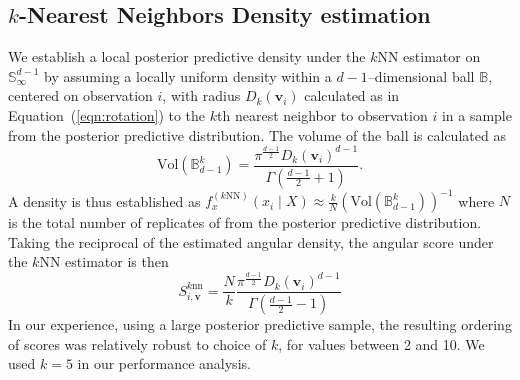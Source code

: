 \subsection{$k$-Nearest Neighbors Density estimation}
We establish a local posterior predictive density under the $k$NN estimator 
    \citep{mack1979} on $\mathbb{S}_{\infty}^{d-1}$ by assuming a locally 
    uniform density within a $d-1$--dimensional ball $\mathbb{B}$, centered on 
    observation $i$, with radius $D_{k}(\bm{v}_i)$ calculated as in 
    Equation~(\ref{eqn:rotation})
    to the $k$th nearest neighbor to observation $i$ in a sample from the 
    posterior predictive distribution. The volume of the ball is calculated as
    \begin{equation}
        \label{eq:vol_sphere}
        \text{Vol}(\mathbb{B}_{d-1}^k) =
        \frac{\pi^{\frac{d-1}{2}}D_{k}(\bm{v}_i)^{d-1}}{
            \Gamma\left(\frac{d-1}{2} + 1\right)}.
    \end{equation}
    A density is thus established as 
    $f_{x}^{(k\text{NN})}(x_i\mid X) \approx 
        \frac{k}{N}\left(\text{Vol}(\mathbb{B}_{d-1}^k)\right)^{-1}$
    where $N$ is the total number of replicates of from the posterior predictive
    distribution.  Taking the reciprocal of the estimated angular density, 
    the angular score under the $k$NN estimator is then
    \begin{equation}
        \label{eq:ad_knn_h}
        S_{i,\bm{v}}^{\text{$k$nn}} = \frac{N}{k}
            \frac{\pi^{\frac{d-1}{2}}D_{k}(\bm{v}_i)^{d-1}}{
            \Gamma\left(\frac{d-1}{2} - 1\right)}
    \end{equation}
    In our experience, using a large posterior predictive sample, 
    the resulting ordering of scores was relatively robust to choice of $k$, for
    values between 2 and 10.  We used $k = 5$ in our performance analysis.

